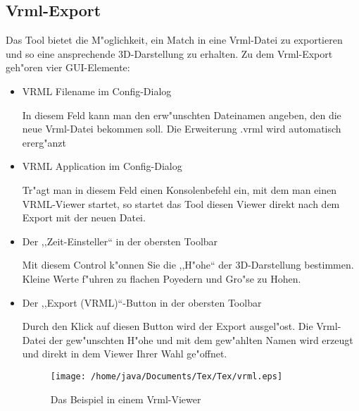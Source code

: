 \subsection{Vrml-Export}
Das Tool bietet die M"oglichkeit, ein Match in eine Vrml-Datei zu exportieren und so eine ansprechende 3D-Darstellung zu erhalten. Zu dem Vrml-Export geh"oren vier GUI-Elemente:
\begin{itemize}
\item VRML Filename im Config-Dialog

 In diesem Feld kann man den erw"unschten Dateinamen angeben, den die neue Vrml-Datei bekommen soll. Die Erweiterung .vrml wird automatisch ererg"anzt
\item VRML Application im Config-Dialog

Tr"agt man in diesem Feld einen Konsolenbefehl ein, mit dem man einen VRML-Viewer startet, so startet das Tool diesen Viewer direkt nach dem Export mit der neuen Datei.

\item Der ,,Zeit-Einsteller`` in der obersten Toolbar

Mit diesem Control k"onnen Sie die ,,H"ohe`` der 3D-Darstellung bestimmen. Kleine Werte f"uhren zu flachen Poyedern und Gro"se zu Hohen.
\item Der ,,Export (VRML)``-Button in der obersten Toolbar

Durch den Klick auf diesen Button wird der Export ausgel"ost. Die Vrml-Datei der gew"unschten H"ohe und mit dem gew"ahlten Namen wird erzeugt und direkt in dem Viewer Ihrer Wahl ge"offnet.
\begin{figure}
   \centering
   \texttt{[image: /home/java/Documents/Tex/Tex/vrml.eps]}
   \caption{Das Beispiel in einem Vrml-Viewer}
   \label{fig:vrml}
\end{figure}
\end{itemize}
